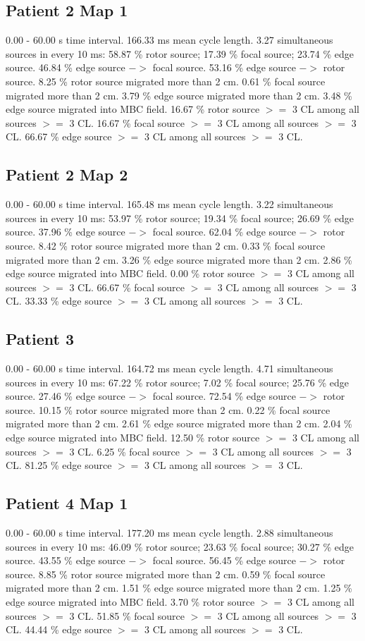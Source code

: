 \documentclass[journal,onecolumn]{IEEEtran} %
\begin{document}
\subsection{Patient 2 Map 1}
0.00 - 60.00 s time interval.
166.33 ms mean cycle length.
3.27 simultaneous sources in every 10 ms:
58.87 \% rotor source;
17.39 \% focal source;
23.74 \% edge source.
46.84 \% edge source $->$ focal source.
53.16 \% edge source $->$ rotor source.
8.25 \% rotor source migrated more than 2 cm.
0.61 \% focal source migrated more than 2 cm.
3.79 \% edge source migrated more than 2 cm.
3.48 \% edge source migrated into MBC field.
16.67 \% rotor source $>=$ 3 CL among all sources $>=$ 3 CL.
16.67 \% focal source $>=$ 3 CL among all sources $>=$ 3 CL.
66.67 \% edge source $>=$ 3 CL among all sources $>=$ 3 CL.

\subsection{Patient 2 Map 2}
0.00 - 60.00 s time interval.
165.48 ms mean cycle length.
3.22 simultaneous sources in every 10 ms:
53.97 \% rotor source;
19.34 \% focal source;
26.69 \% edge source.
37.96 \% edge source $->$ focal source.
62.04 \% edge source $->$ rotor source.
8.42 \% rotor source migrated more than 2 cm.
0.33 \% focal source migrated more than 2 cm.
3.26 \% edge source migrated more than 2 cm.
2.86 \% edge source migrated into MBC field.
0.00 \% rotor source $>=$ 3 CL among all sources $>=$ 3 CL.
66.67 \% focal source $>=$ 3 CL among all sources $>=$ 3 CL.
33.33 \% edge source $>=$ 3 CL among all sources $>=$ 3 CL.

\subsection{Patient 3}
0.00 - 60.00 s time interval.
164.72 ms mean cycle length.
4.71 simultaneous sources in every 10 ms:
67.22 \% rotor source;
7.02 \% focal source;
25.76 \% edge source.
27.46 \% edge source $->$ focal source.
72.54 \% edge source $->$ rotor source.
10.15 \% rotor source migrated more than 2 cm.
0.22 \% focal source migrated more than 2 cm.
2.61 \% edge source migrated more than 2 cm.
2.04 \% edge source migrated into MBC field.
12.50 \% rotor source $>=$ 3 CL among all sources $>=$ 3 CL.
6.25 \% focal source $>=$ 3 CL among all sources $>=$ 3 CL.
81.25 \% edge source $>=$ 3 CL among all sources $>=$ 3 CL.

\subsection{Patient 4 Map 1}
0.00 - 60.00 s time interval.
177.20 ms mean cycle length.
2.88 simultaneous sources in every 10 ms:
46.09 \% rotor source;
23.63 \% focal source;
30.27 \% edge source.
43.55 \% edge source $->$ focal source.
56.45 \% edge source $->$ rotor source.
8.85 \% rotor source migrated more than 2 cm.
0.59 \% focal source migrated more than 2 cm.
1.51 \% edge source migrated more than 2 cm.
1.25 \% edge source migrated into MBC field.
3.70 \% rotor source $>=$ 3 CL among all sources $>=$ 3 CL.
51.85 \% focal source $>=$ 3 CL among all sources $>=$ 3 CL.
44.44 \% edge source $>=$ 3 CL among all sources $>=$ 3 CL.
\end{document}
